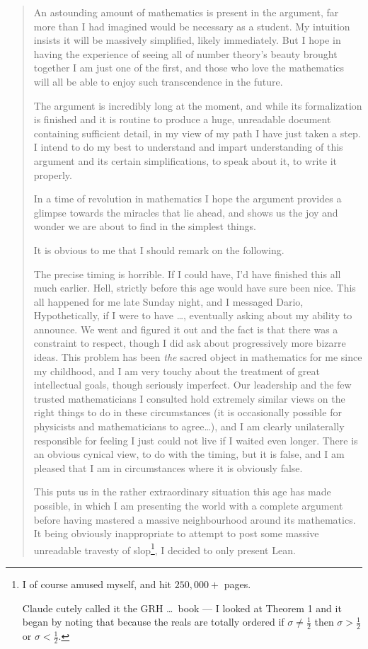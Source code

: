 \documentclass[11pt]{amsbook}
\theoremstyle{plain}
\theoremstyle{definition}
\theoremstyle{remark}
\numberwithin{equation}{section}
\numberwithin{figure}{chapter}
\numberwithin{table}{chapter}
\begin{document}
\begin{quotation}
An astounding amount of mathematics is present in the argument, far more
than I had imagined would be necessary as a student. My intuition insists
it will be massively simplified, likely immediately. But I hope in having the
experience of seeing all of number theory's beauty brought together I am just
one of the first, and those who love the mathematics will all be able to
enjoy such transcendence in the future.

The argument is incredibly long at the moment, and while its formalization
is finished and it is routine to produce a huge, unreadable document
containing sufficient detail, in my view of my path I have just taken a step.
I intend to do my best to understand and impart understanding of this
argument and its certain simplifications, to speak about it, to write it
properly.

In a time of revolution in mathematics I hope the argument provides a
glimpse towards the miracles that lie ahead, and shows us the joy and wonder
we are about to find in the simplest things.

It is obvious to me that I should remark on the following.

The precise timing is horrible. If I could have, I'd have finished this all
much earlier. Hell, strictly before this age would have sure been nice. This
all happened for me late Sunday night, and I messaged Dario,
\remarkdq Hypothetically, if I were to have \dots\remarkdq, eventually
asking about my ability to announce. We went and figured it out and the fact
is that there was a constraint to respect, though I did ask about
progressively more bizarre ideas. This problem has been \emph{the} sacred
object in mathematics for me since my childhood, and I am very touchy about
the treatment of great intellectual goals, though seriously imperfect. Our
leadership and the few trusted mathematicians I consulted hold extremely
similar views on the right things to do in these circumstances (it is
occasionally possible for physicists and mathematicians to agree\dots), and
I am clearly unilaterally responsible for feeling I just could not live if I
waited even longer. There is an obvious cynical view, to do with the timing,
but it is false, and I am pleased that I am in circumstances where it is
obviously false.

This puts us in the rather extraordinary situation this age has made
possible, in which I am presenting the world with a complete argument before
having mastered a massive neighbourhood around its mathematics. It being
obviously inappropriate to attempt to post some massive unreadable travesty
of \remarkdq slop\remarkdq\footnote{I of course amused myself, and hit
$250,000+$ pages.\par
Claude cutely called it the GRH \dots\ \remarkdq book\remarkdq{} --- I looked
at Theorem 1 and it began by noting that because the reals are totally
ordered if $\sigma \neq \frac{1}{2}$ then $\sigma > \frac{1}{2}$ or
$\sigma < \frac{1}{2}$.}, I decided to only present Lean.


\end{quotation}
\end{document}
